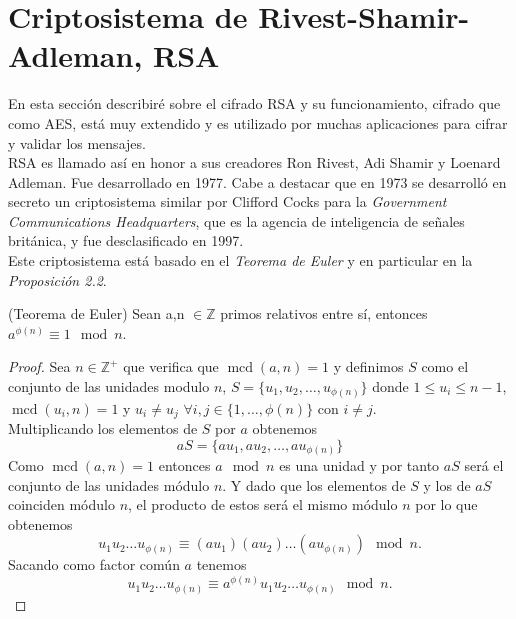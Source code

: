 \section{Criptosistema de Rivest-Shamir-Adleman, RSA}
En esta sección describiré sobre el cifrado RSA y su funcionamiento, cifrado que como AES, está muy extendido y es utilizado por muchas aplicaciones para cifrar y validar los mensajes.\\
RSA es llamado así en honor a sus creadores Ron Rivest, Adi Shamir y Loenard Adleman. Fue desarrollado en 1977. Cabe a destacar que en 1973 se desarrolló en secreto un criptosistema similar por Clifford Cocks para la \emph{Government Communications Headquarters}, que es la agencia de inteligencia de señales británica, y fue desclasificado en 1997\cite{cliffordCocks}.\\
Este criptosistema está basado en el \emph{Teorema de Euler} y en particular en la \emph{Proposición 2.2}.\\


\begin{teorema}
	(Teorema de Euler) Sean a,n $\in \mathbb{Z}$ primos relativos entre sí, entonces $a^{\phi(n)}\equiv 1 \mod n$.
\end{teorema}\vspace*{-7mm}
\begin{proof}
		Sea $n\in \mathbb{Z^+}$ que verifica que $\operatorname{mcd}(a,n)=1$ y definimos $S$ como el conjunto de las unidades modulo $n$, $S=\{u_1,u_2,\dots,u_{\phi(n)}\}$ donde $1\leq u_i\leq n-1$, $\operatorname{mcd}(u_i,n)=1$ y $u_i\neq u_j$ $\forall i,j \in \{1,\dots,\phi(n)\}$ con $ i\neq j$.\\
	Multiplicando  los elementos de $S$ por $a$ obtenemos 
	$$
		aS=\{au_1,au_2,\dots,au_{\phi(n)}\}
	$$
	Como $\operatorname{mcd}(a,n)=1$ entonces $a\mod n$ es una unidad y por tanto $aS$ será el conjunto de las unidades módulo $n$. Y dado que los elementos de $S$ y los de $aS$ coinciden módulo $n$, el producto de estos será el mismo módulo $n$ por lo que obtenemos 
	$$
		u_1u_2\dots u_{\phi(n)} \equiv (au_1)(au_2)\dots (au_{\phi(n)})\mod n.
	$$
	Sacando como factor común $a$ tenemos 
	$$
		u_1u_2\dots u_{\phi(n)} \equiv a^{\phi(n)}u_1u_2\dots u_{\phi(n)}\mod n. 
	$$
\end{proof}\\

